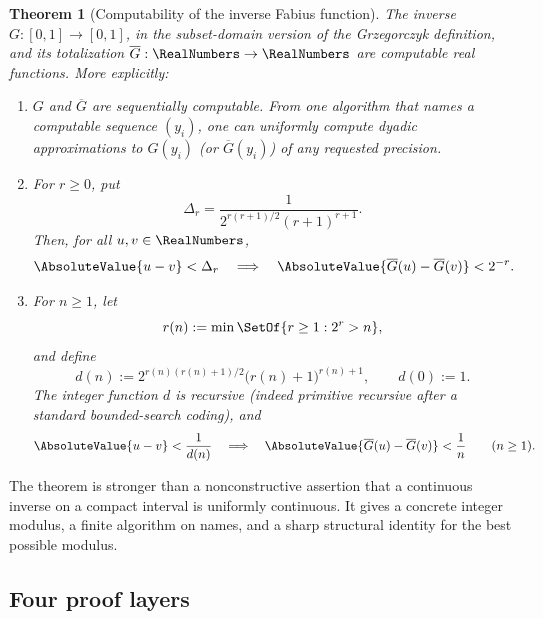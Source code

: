 \documentclass[11pt,oneside]{article}
\newtheorem{theorem}{Theorem}[section]
\theoremstyle{definition}
\theoremstyle{remark}
\numberwithin{equation}{section}
\newcommand{\InvT}{\overline G}
\begin{document}
\begin{theorem}[Computability of the inverse Fabius function]\label{thm:main}
The inverse $G:[0,1]\to[0,1]$, in the subset-domain version of the
Grzegorczyk definition, and its totalization $\InvT:\RealNumbers\to\RealNumbers$ are computable
real functions.  More explicitly:
\begin{enumerate}
\item $G$ and $\InvT$ are sequentially computable.  From one algorithm that
      names a computable sequence $(y_i)$, one can uniformly compute dyadic
      approximations to $G(y_i)$ (or $\InvT(y_i)$) of any requested precision.
\item For $r\ge0$, put
      \begin{equation}\label{eq:Delta-intro}
       \Delta_r=\frac{1}{2^{r(r+1)/2}(r+1)^{r+1}}.
      \end{equation}
      Then, for all $u,v\in\RealNumbers$,
      \begin{equation}\label{eq:explicit-dyadic-modulus-intro}
       \AbsoluteValue{u-v}<\Delta_r
       \quad\Longrightarrow\quad
       \AbsoluteValue{\InvT(u)-\InvT(v)}<2^{-r}.
      \end{equation}
\item For $n\ge1$, let
      \begin{equation}\label{eq:r-of-n}
       r(n):=\min\SetOf{r\ge1:2^r>n},
      \end{equation}
      and define
      \begin{equation}\label{eq:d-of-n-intro}
       d(n):=2^{r(n)(r(n)+1)/2}\bigl(r(n)+1\bigr)^{r(n)+1},
       \qquad d(0):=1.
      \end{equation}
      The integer function $d$ is recursive (indeed primitive recursive after
      a standard bounded-search coding), and
      \begin{equation}\label{eq:wikipedia-modulus-intro}
       \AbsoluteValue{u-v}<\frac1{d(n)}
       \quad\Longrightarrow\quad
       \AbsoluteValue{\InvT(u)-\InvT(v)}<\frac1n
       \qquad(n\ge1).
      \end{equation}
\end{enumerate}
\end{theorem}

The theorem is stronger than a nonconstructive assertion that a continuous
inverse on a compact interval is uniformly continuous.  It gives a concrete
integer modulus, a finite algorithm on names, and a sharp structural identity
for the best possible modulus.

\subsection{Four proof layers}
\end{document}
